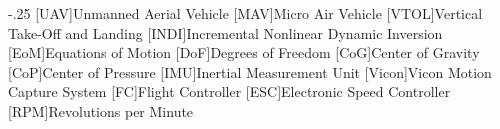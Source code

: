 \documentclass[headsepline,footsepline,footinclude=false,oneside,fontsize=11pt,paper=a4,listof=totoc,bibliography=totoc]{scrbook} %
\begin{document}


\frontmatter{}





\tableofcontents{}

\mainmatter{}













\begin{acronym}
	\itemsep-.25\baselineskip
	[UAV]{Unmanned Aerial Vehicle}
	[MAV]{Micro Air Vehicle}
	[VTOL]{Vertical Take-Off and Landing}
	[INDI]{Incremental Nonlinear Dynamic Inversion}
	[EoM]{Equations of Motion}
	[DoF]{Degrees of Freedom}
	[CoG]{Center of Gravity}
	[CoP]{Center of Pressure}
	[IMU]{Inertial Measurement Unit}
	[Vicon]{Vicon Motion Capture System}
	[FC]{Flight Controller}
	[ESC]{Electronic Speed Controller}
	[RPM]{Revolutions per Minute}
\end{acronym}

\listoffigures{}
\listoftables{}
\printbibliography{}
\end{document}
